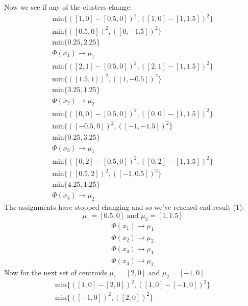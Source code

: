 \documentclass[12pt]{article}
\begin{document}
\begin{enumerate}[label=(\alph*)]
			Now we see if any of the clusters change:
			\begin{gather*}
				\text{min} \{ ( [1,0] - [0.5, 0] )^2, ( [1,0] - [1, 1.5] )^2\} \\
				\text{min} \{ ( [0.5,0] )^2, ( [0, -1.5] )^2\} \\
				\text{min} \{ 0.25, 2.25\} \\
				\Phi(x_1) \rightarrow \mu_1
			\end{gather*}
			\begin{gather*}
				\text{min} \{ ( [2,1] - [0.5, 0] )^2, ( [2,1] - [1, 1.5] )^2\} \\
				\text{min} \{ ( [1.5,1] )^2, ( [1, -0.5] )^2\} \\
				\text{min} \{3.25, 1.25\} \\
				\Phi(x_2) \rightarrow \mu_2
			\end{gather*}
			\begin{gather*}
				\text{min} \{ ( [0,0] - [0.5, 0] )^2, ( [0,0] - [1, 1.5] )^2\} \\
				\text{min} \{ ( [-0.5,0] )^2, ( [-1, -1.5] )^2\} \\
				\text{min} \{ 0.25, 3.25\} \\
				\Phi(x_3) \rightarrow \mu_1
			\end{gather*}
			\begin{gather*}
				\text{min} \{ ( [0,2] - [0.5, 0] )^2, ( [0,2] - [1, 1.5] )^2\} \\
				\text{min} \{ ( [0.5,2] )^2, ( [-1, 0.5] )^2\} \\
				\text{min} \{ 4.25, 1.25\} \\
				\Phi(x_4) \rightarrow \mu_2
			\end{gather*}
			The assignments have stopped changing and so we've reached end result (1):
			\[
				\mu_1 = [0.5, 0] \text{ and } \mu_2 = [1, 1.5]
			\]
			\begin{gather*}
				\Phi(x_1) \rightarrow \mu_1 \\
				\Phi(x_2) \rightarrow \mu_2 \\
				\Phi(x_3) \rightarrow \mu_1 \\
				\Phi(x_4) \rightarrow \mu_2
			\end{gather*}
			Now for the next set of centroids
			\(\mu_1 = [2, 0] \text{ and } \mu_2 = [-1, 0]\)
			\begin{gather*}
				\text{min} \{ ( [1,0] - [2, 0] )^2, ( [1,0] - [-1, 0] )^2\} \\
				\text{min} \{ ( [-1,0] )^2, ( [2, 0] )^2\} \\

\end{gather*}
\end{enumerate}
\end{document}
